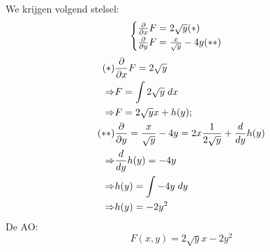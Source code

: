{\begin{equation*}
\begin{split}
    \end{split}
   \end{equation*}
    We krijgen volgend stelsel:
    $$\begin{cases}
       \frac{\partial}{\partial x}F = 2\sqrt{y} (*) \\
       \frac{\partial}{\partial y}F = \frac{x}{\sqrt{y}} - 4y (**)
      \end{cases}
    $$
    \begin{equation*}
     \begin{split}
      (*) & \frac{\partial}{\partial x}F = 2\sqrt{y}  \\
      \Rightarrow & F = \int 2\sqrt{y}\; dx  \\
      \Rightarrow & F = 2\sqrt{y}x + h(y); \\
      (**) & \frac{\partial}{\partial y} = \frac{x}{\sqrt{y}} - 4y = 2x\frac{1}{2\sqrt{y}} + \frac{d}{d y}h(y) \\
      \Rightarrow & \frac{d}{d y}h(y) = -4y \\
      \Rightarrow & h(y) = \int -4y \; dy \\
      \Rightarrow & h(y) = -2y^2
     \end{split}
    \end{equation*}
    De AO:
    $$F(x, y) = 2\sqrt{y}x - 2y^2$$
}

